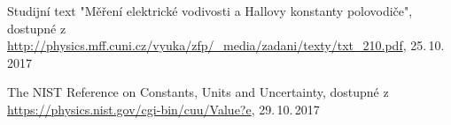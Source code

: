 \documentclass[0-protokol.tex]{subfiles}
\begin{document}
\begin{thebibliography}{}

Studijní text "Měření elektrické vodivosti a Hallovy konstanty polovodiče", dostupné z\\ \url{http://physics.mff.cuni.cz/vyuka/zfp/_media/zadani/texty/txt_210.pdf}, 25.\,10.\,2017

The NIST Reference on Constants, Units and Uncertainty, dostupné z\\ \url{https://physics.nist.gov/cgi-bin/cuu/Value?e}, 29.\,10.\,2017

\begin{comment}

\bibitem{cizek_1}   %
Doc. Mgr. Jakub Čížek, PhD.: prezentace Úvod do praktické fyziky, seminář 1, dostupné z \url{http://physics.mff.cuni.cz/kfnt/vyuka/upf/seminar1.pdf}

\bibitem{cizek_9}   %
Doc. Mgr. Jakub Čížek, PhD.: prezentace Úvod do praktické fyziky, seminář 9, dostupné z \url{http://physics.mff.cuni.cz/kfnt/vyuka/upf/seminar9.pdf}

\bibitem{cizek_10}  %
Doc. Mgr. Jakub Čížek, PhD.: prezentace Úvod do praktické fyziky, seminář 10, dostupné z \url{http://physics.mff.cuni.cz/kfnt/vyuka/upf/seminar10.pdf}

\end{comment}

\end{thebibliography}
\end{document}
